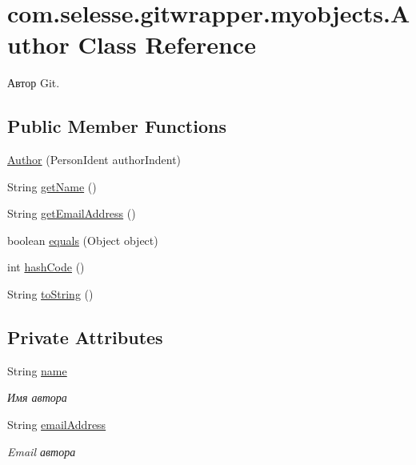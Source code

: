 \hypertarget{classcom_1_1selesse_1_1gitwrapper_1_1myobjects_1_1_author}{}\section{com.\+selesse.\+gitwrapper.\+myobjects.\+Author Class Reference}
\label{classcom_1_1selesse_1_1gitwrapper_1_1myobjects_1_1_author}


Автор Git.  


\subsection*{Public Member Functions}
\begin{DoxyCompactItemize}
\item 
\hyperlink{classcom_1_1selesse_1_1gitwrapper_1_1myobjects_1_1_author_aa61b57e3b7e08a4de3ad0359a33c8173}{Author} (Person\+Ident author\+Indent)
\item 
String \hyperlink{classcom_1_1selesse_1_1gitwrapper_1_1myobjects_1_1_author_aed9dd31a6e46a7f0aed1ac480e8abdb1}{get\+Name} ()
\item 
String \hyperlink{classcom_1_1selesse_1_1gitwrapper_1_1myobjects_1_1_author_a42225ddc9f30e05c24cf0e986e2188e7}{get\+Email\+Address} ()
\item 
boolean \hyperlink{classcom_1_1selesse_1_1gitwrapper_1_1myobjects_1_1_author_a6f6e946a4f8df76bdc01a52f0022f722}{equals} (Object object)
\item 
int \hyperlink{classcom_1_1selesse_1_1gitwrapper_1_1myobjects_1_1_author_ac7372bbdf5087c672e8ef1604e953030}{hash\+Code} ()
\item 
String \hyperlink{classcom_1_1selesse_1_1gitwrapper_1_1myobjects_1_1_author_a040f51a8059aa5c4dd692c03d7492be5}{to\+String} ()
\end{DoxyCompactItemize}
\subsection*{Private Attributes}
\begin{DoxyCompactItemize}
\item 
String \hyperlink{classcom_1_1selesse_1_1gitwrapper_1_1myobjects_1_1_author_aa0a3b9c70dc3d85a02acf8c1241a7a0e}{name}
\begin{DoxyCompactList}\small\item\em Имя автора \end{DoxyCompactList}\item 
String \hyperlink{classcom_1_1selesse_1_1gitwrapper_1_1myobjects_1_1_author_a69b9343309e513d43ebae1234a81b45e}{email\+Address}
\begin{DoxyCompactList}\small\item\em Email автора \end{DoxyCompactList}\end{DoxyCompactItemize}


